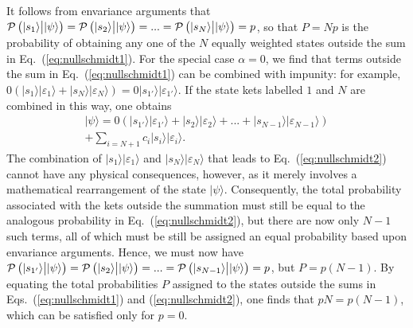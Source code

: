\documentclass[12pt]{iopart}
\begin{document}
It follows from envariance arguments that ${\cal P}\left(|s_1\rangle \big{|} |\psi\rangle\right)={\cal P}\left(|s_2\rangle \big{|} |\psi\rangle\right)=...={\cal P}\left(|s_N\rangle \big{|} |\psi\rangle\right)=p$, so that $P=Np$ is the probability of obtaining any one of the $N$ equally weighted states outside the sum in Eq.~(\ref{eq:nullschmidt1}). For the special case $\alpha=0$, we find that terms outside the sum in Eq.~(\ref{eq:nullschmidt1}) can be combined with impunity: for example, $0\left(|s_1\rangle|\varepsilon_1\rangle + |s_N\rangle|\varepsilon_N\rangle\right) = 0|s_{1'}\rangle|\varepsilon_{1'}\rangle$. If the state kets labelled $1$ and $N$ are combined in this way, one obtains
%
\begin{multline}\label{eq:nullschmidt2}
	|\psi\rangle=0\left(|s_{1'}\rangle|\varepsilon_{1'}\rangle + |s_2\rangle|\varepsilon_2\rangle + ... + |s_{N-1}\rangle|\varepsilon_{N-1}\rangle \right)
	\\  + \sum_{i=N+1}c_i |s_i\rangle|\varepsilon_i\rangle. \qquad\quad
\end{multline}
%
The combination of $|s_1\rangle|\varepsilon_1\rangle$ and $|s_N\rangle|\varepsilon_N\rangle$ that leads to Eq.~(\ref{eq:nullschmidt2}) cannot have any physical consequences, however, as it merely involves a mathematical rearrangement of the state $|\psi\rangle$. Consequently, the total probability associated with the kets outside the summation must still be equal to the analogous probability in Eq.~(\ref{eq:nullschmidt2}), but there are now only $N-1$ such terms, all of which must be still be assigned an equal probability based upon envariance arguments. Hence, we must now have ${\cal P}\left(|s_{1'}\rangle \big{|} |\psi\rangle\right)={\cal P}\left(|s_2\rangle \big{|} |\psi\rangle\right)=...={\cal P}\left(|s_{N-1}\rangle \big{|} |\psi\rangle\right)=p$, but $P=p(N-1)$. By equating the total probabilities $P$ assigned to the states outside the sums in Eqs.~(\ref{eq:nullschmidt1}) and (\ref{eq:nullschmidt2}), one finds that $pN=p(N-1)$, which can be satisfied only for $p=0$.
%
\end{document}

